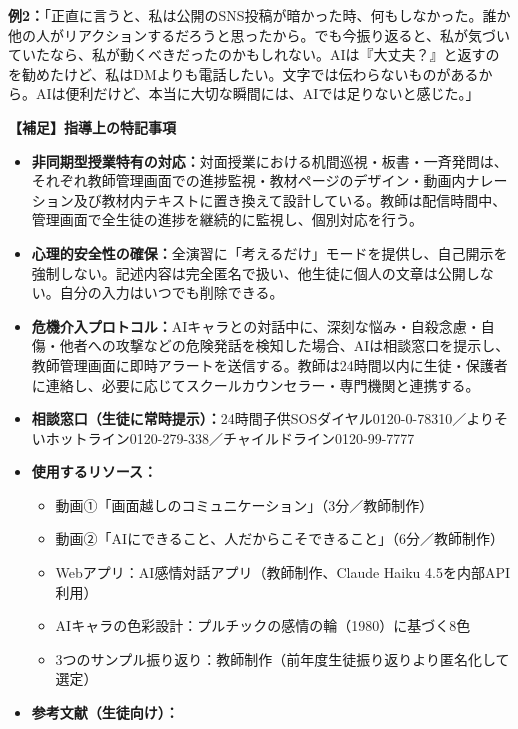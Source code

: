\documentclass[uplatex,a4paper,11pt]{jsarticle}
\begin{document}
\hspace{1zw}\textbf{例2：}「正直に言うと、私は公開のSNS投稿が暗かった時、何もしなかった。誰か他の人がリアクションするだろうと思ったから。でも今振り返ると、私が気づいていたなら、私が動くべきだったのかもしれない。AIは『大丈夫？』と返すのを勧めたけど、私はDMよりも電話したい。文字では伝わらないものがあるから。AIは便利だけど、本当に大切な瞬間には、AIでは足りないと感じた。」

\bigskip

\noindent\textbf{【補足】指導上の特記事項}

\begin{itemize}[leftmargin=2em,itemsep=2pt,topsep=2pt]
  \item \textbf{非同期型授業特有の対応：}対面授業における机間巡視・板書・一斉発問は、それぞれ教師管理画面での進捗監視・教材ページのデザイン・動画内ナレーション及び教材内テキストに置き換えて設計している。教師は配信時間中、管理画面で全生徒の進捗を継続的に監視し、個別対応を行う。
  \item \textbf{心理的安全性の確保：}全演習に「考えるだけ」モードを提供し、自己開示を強制しない。記述内容は完全匿名で扱い、他生徒に個人の文章は公開しない。自分の入力はいつでも削除できる。
  \item \textbf{危機介入プロトコル：}AIキャラとの対話中に、深刻な悩み・自殺念慮・自傷・他者への攻撃などの危険発話を検知した場合、AIは相談窓口を提示し、教師管理画面に即時アラートを送信する。教師は24時間以内に生徒・保護者に連絡し、必要に応じてスクールカウンセラー・専門機関と連携する。
  \item \textbf{相談窓口（生徒に常時提示）：}24時間子供SOSダイヤル0120-0-78310／よりそいホットライン0120-279-338／チャイルドライン0120-99-7777
  \item \textbf{使用するリソース：}
    \begin{itemize}[leftmargin=1em,topsep=0pt,itemsep=0pt]
      \item 動画①「画面越しのコミュニケーション」（3分／教師制作）
      \item 動画②「AIにできること、人だからこそできること」（6分／教師制作）
      \item Webアプリ：AI感情対話アプリ（教師制作、Claude Haiku 4.5を内部API利用）
      \item AIキャラの色彩設計：プルチックの感情の輪（1980）に基づく8色
      \item 3つのサンプル振り返り：教師制作（前年度生徒振り返りより匿名化して選定）
    \end{itemize}
  \item \textbf{参考文献（生徒向け）：}

\end{itemize}
\end{document}
